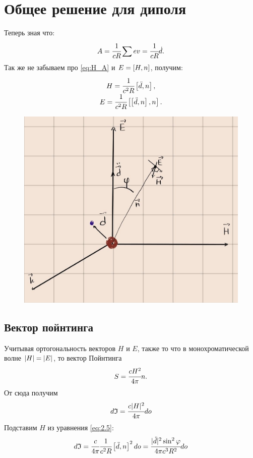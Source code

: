 
\section{Общее решение для диполя}

Теперь зная что:
\begin{equation}
    A = \cfrac{1}{cR} \sum ev = \cfrac{1}{cR} \dot d.
\end{equation}
Так же не забываем про \ref{eq:H_A} и $E = \left[ H, n \right]$, получим:
\begin{eqnarray}
    \begin{matrix}
        H = \cfrac{1}{c^2R}\left[ \ddot d, n \right], \\
        E = \cfrac{1}{c^2R}\left[ \left[ \ddot d, n \right], n \right].
    \end{matrix}
    \label{eq:2.5}
\end{eqnarray}
\begin{figure}[H]
    \centering
    \includegraphics[trim={0 0 0 0},clip,width=\textwidth]{sours_img/sh.jpg}
    \label{pict}
\end{figure}

\subsection{Вектор пойнтинга}
Учитывая ортогональность векторов $H$ и $E$, также то что в 
монохроматической волне $\abs{H} = \abs{E}$, то вектор Пойнтинга
\begin{equation}
    S = \cfrac{cH^2}{4\pi}n.
\end{equation}
От сюда получим 
\begin{equation}
    d\mathfrak{I} = \cfrac{c|H|^2}{4\pi}do
    \label{eq:2.7}
\end{equation}
Подставим $H$ из уравнения \ref{eq:2.5}:
\begin{equation}
    d\mathfrak{I} = \cfrac{c}{4\pi} \cfrac{1}{c^2R} \left[ \ddot d, n \right]^2do 
    =  \cfrac{|\ddot d|^2 \sin^2 \varphi}{4\pi c^3 R^2} do
    \label{eq:J_ddotd}
\end{equation}



